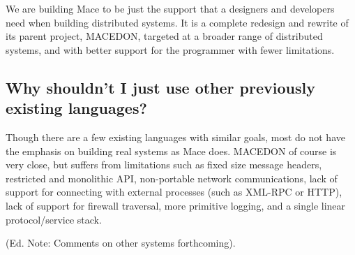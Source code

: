 We are building Mace to be just the support that a designers and developers
need when building distributed systems.  It is a complete redesign and rewrite
of its parent project, MACEDON, targeted at a broader range of distributed
systems, and with better support for the programmer with fewer limitations.

\subsection{Why shouldn't I just use other previously existing languages?}
\label{sec:why-mace}

Though there are a few existing languages with similar goals, most do
not have the emphasis on building real systems as Mace does.  MACEDON
of course is very close, but suffers from limitations such as fixed
size message headers, restricted and monolithic API, non-portable 
network communications, lack of support for connecting with external
processes (such as XML-RPC or HTTP), lack of support for firewall
traversal, more primitive logging, and a single linear protocol/service
stack.

(Ed. Note: Comments on other systems forthcoming).



